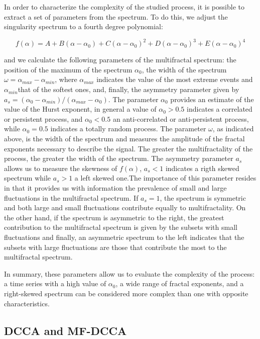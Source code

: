 \documentclass[onecolumn, preprint,aps,amsmath, amssymb, superscriptaddress]{revtex4}
\begin{document}
In order to characterize the complexity of the studied process, it is possible to extract a set of parameters from the spectrum. To do this, we adjust the singularity spectrum to a fourth degree polynomial:

\begin{equation}
f(\alpha) =  A + B(\alpha - \alpha_0) + C(\alpha - \alpha_0)^2 + D(\alpha - \alpha_0)^3 + E(\alpha - \alpha_0)^4
\end{equation}

and we calculate the following parameters of the multifractal spectrum: the position of the maximum of the spectrum $\alpha_0$, the width of the spectrum $\omega = \alpha_{max}-\alpha_{min}$, where $\alpha_{max}$ indicates the value of the most extreme events and $\alpha_{min}$that of the softest ones, and, finally, the asymmetry parameter given by $a_s = (\alpha_0-\alpha_{min})/(\alpha_{max}-\alpha_0)$. The parameter $\alpha_0$ provides an estimate of the value of the Hurst exponent, in general a value of $\alpha_0 > 0.5$ indicates a correlated or persistent process, and $\alpha_0 < 0.5$ an anti-correlated or anti-persistent process, while $\alpha_0 = 0.5$ indicates a totally random process. The parameter $\omega$, as indicated above, is the width of the spectrum and measures the amplitude of the fractal exponents necessary to describe the signal. The greater the multifractality of the process, the greater the width of the spectrum. The asymmetry parameter $a_s$ allows us to measure the skewness of $f(\alpha)$, $a_s<1$ indicates a rigth skewed spectrum while $a_s>1$ a left skewed one.The importance of this parameter resides in that it provides us with information  the prevalence of small and large fluctuations in the multifractal spectrum. If $a_s = 1$, the spectrum is symmetric and both large and small fluctuations contribute equally to multifractality. On the other hand, if the spectrum is asymmetric to the right, the greatest contribution to the multifractal spectrum is given by the subsets with small fluctuations and finally, an asymmetric spectrum to the left indicates that the subsets with large fluctuations are those that contribute the most to the multifractal spectrum.

In summary, these parameters allow us to evaluate the complexity of the process: a time series with a high value of $\alpha_0$, a wide range of fractal exponents, and a right-skewed spectrum can be considered more complex than one with opposite characteristics.

\subsection{DCCA and MF-DCCA}
\end{document}
